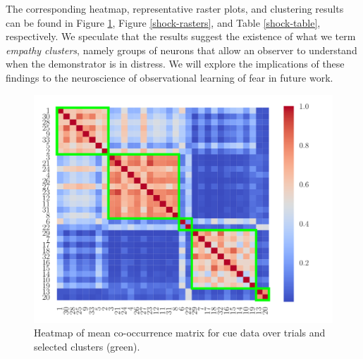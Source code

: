\documentclass[twoside]{article}
\begin{document}
The corresponding heatmap, representative raster plots, and clustering results can be found in Figure \ref{shock-hm}, Figure \ref{shock-rasters}, and Table \ref{shock-table}, respectively. We speculate that the results suggest the existence of what we term \emph{empathy clusters}, namely groups of neurons that allow an observer to understand when the demonstrator is in distress. We will explore the implications of these findings to the neuroscience of observational learning of fear in future work.
\begin{figure}[h]
\begin{center}
\includegraphics[scale=0.3]{../img/shock_mod_cue.pdf}
\end{center}
\caption{Heatmap of mean co-occurrence matrix for cue data over trials and selected clusters (green).} 
\label{shock-hm}
\end{figure} 

\end{document}
